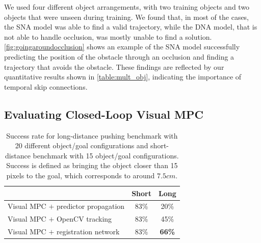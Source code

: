 We used four different object arrangements, with two training objects and two objects that were unseen during training. We found that, in most of the cases, the SNA model was able to find a valid trajectory, while the DNA model, that is not able to handle occlusion, was mostly unable to find a solution. \autoref{fig:goingaroundocclusion} shows an example of the SNA model successfully predicting the position of the obstacle through an occlusion and finding a trajectory that avoids the obstacle. These findings are reflected by our quantitative results shown in \autoref{table:mult_obj}, indicating the importance of temporal skip connections.

\subsection{Evaluating Closed-Loop Visual MPC}

\begin{table}
	{\footnotesize
		\begin{center}
			\begin{tabular}{lcc}
				\toprule
				& Short & Long \\
				\midrule
				Visual MPC $+$ predictor propagation  & 83\% & 20\% \\
				Visual MPC $+$ OpenCV tracking  & 83\%  & 45\% \\
				Visual MPC $+$ registration network & 83\% & \textbf{66\%}  \\
				\bottomrule
			\end{tabular}
		\end{center}
	}
	\caption{\small Success rate for long-distance pushing benchmark with 20 different object/goal configurations and short-distance benchmark with 15 object/goal configurations. Success is defined as bringing the object closer than 15 pixels to the goal, which corresponds to around $7.5cm$.}
	\label{table:res_long_short}
\end{table}

